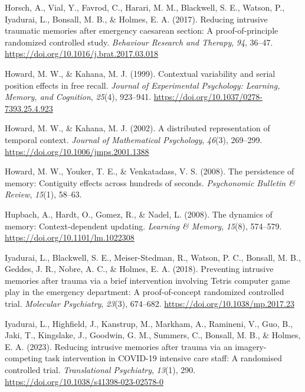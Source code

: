 \documentclass[
  man,
  floatsintext,
  longtable,
  nolmodern,
  notxfonts,
  notimes,
  draftfirst,
  colorlinks=true,linkcolor=blue,citecolor=blue,urlcolor=blue]{apa7}
\newlength{\cslhangindent}
\newenvironment{CSLReferences}[2] %
 {\begin{list}{}{%
  \setlength{\itemindent}{0pt}
  \setlength{\leftmargin}{0pt}
  \setlength{\parsep}{0pt}
  \ifodd #1
   \setlength{\leftmargin}{\cslhangindent}
   \setlength{\itemindent}{-1\cslhangindent}
  \fi
  \setlength{\itemsep}{#2\baselineskip}}}
 {\end{list}}
\begin{document}
\begin{CSLReferences}{1}{0}
Horsch, A., Vial, Y., Favrod, C., Harari, M. M., Blackwell, S. E.,
Watson, P., Iyadurai, L., Bonsall, M. B., \& Holmes, E. A. (2017).
Reducing intrusive traumatic memories after emergency caesarean section:
A proof-of-principle randomized controlled study. \emph{Behaviour
Research and Therapy}, \emph{94}, 36--47.
\url{https://doi.org/10.1016/j.brat.2017.03.018}

Howard, M. W., \& Kahana, M. J. (1999). Contextual variability and
serial position effects in free recall. \emph{Journal of Experimental
Psychology: Learning, Memory, and Cognition}, \emph{25}(4), 923--941.
\url{https://doi.org/10.1037/0278-7393.25.4.923}

Howard, M. W., \& Kahana, M. J. (2002). A distributed representation of
temporal context. \emph{Journal of Mathematical Psychology},
\emph{46}(3), 269--299. \url{https://doi.org/10.1006/jmps.2001.1388}

Howard, M. W., Youker, T. E., \& Venkatadass, V. S. (2008). The
persistence of memory: Contiguity effects across hundreds of seconds.
\emph{Psychonomic Bulletin \& Review}, \emph{15}(1), 58--63.

Hupbach, A., Hardt, O., Gomez, R., \& Nadel, L. (2008). The dynamics of
memory: Context-dependent updating. \emph{Learning \& Memory},
\emph{15}(8), 574--579. \url{https://doi.org/10.1101/lm.1022308}

Iyadurai, L., Blackwell, S. E., Meiser-Stedman, R., Watson, P. C.,
Bonsall, M. B., Geddes, J. R., Nobre, A. C., \& Holmes, E. A. (2018).
Preventing intrusive memories after trauma via a brief intervention
involving {Tetris} computer game play in the emergency department: A
proof-of-concept randomized controlled trial. \emph{Molecular
Psychiatry}, \emph{23}(3), 674--682.
\url{https://doi.org/10.1038/mp.2017.23}

Iyadurai, L., Highfield, J., Kanstrup, M., Markham, A., Ramineni, V.,
Guo, B., Jaki, T., Kingslake, J., Goodwin, G. M., Summers, C., Bonsall,
M. B., \& Holmes, E. A. (2023). Reducing intrusive memories after trauma
via an imagery-competing task intervention in {COVID-19} intensive care
staff: A randomised controlled trial. \emph{Translational Psychiatry},
\emph{13}(1), 290. \url{https://doi.org/10.1038/s41398-023-02578-0}


\end{CSLReferences}
\end{document}
